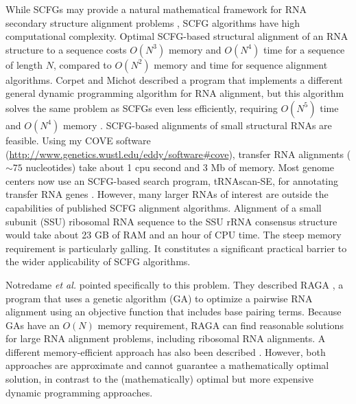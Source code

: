 \documentclass[11pt]{article}
\begin{document}
While SCFGs may provide a natural mathematical framework for RNA
secondary structure alignment problems \cite{Durbin98}, SCFG
algorithms have high computational complexity. Optimal SCFG-based
structural alignment of an RNA structure to a sequence costs $O(N^3)$
memory and $O(N^4)$ time for a sequence of length $N$, compared to
$O(N^2)$ memory and time for sequence alignment algorithms. Corpet and
Michot described a program that implements a different general dynamic
programming algorithm for RNA alignment, but this algorithm solves the
same problem as SCFGs even less efficiently, requiring $O(N^5)$ time
and $O(N^4)$ memory \cite{Corpet94}.  SCFG-based alignments of small
structural RNAs are feasible. Using my COVE software
(\url{http://www.genetics.wustl.edu/eddy/software#cove}), transfer RNA
alignments ($\sim 75$ nucleotides) take about 1 cpu second and 3 Mb of
memory. Most genome centers now use an SCFG-based search program,
tRNAscan-SE, for annotating transfer RNA genes
\cite{LoweEddy97}. However, many larger RNAs of interest are outside
the capabilities of published SCFG alignment algorithms. Alignment of
a small subunit (SSU) ribosomal RNA sequence to the SSU rRNA consensus
structure would take about 23 GB of RAM and an hour of CPU time. The
steep memory requirement is particularly galling. It constitutes a
significant practical barrier to the wider applicability of SCFG
algorithms.


Notredame \emph{et al.} pointed specifically to this problem.  They
described RAGA \cite{Notredame97}, a program that uses a genetic
algorithm (GA) to optimize a pairwise RNA alignment using an objective
function that includes base pairing terms. Because GAs have an $O(N)$
memory requirement, RAGA can find reasonable solutions for large RNA
alignment problems, including ribosomal RNA alignments. A different
memory-efficient approach has also been described
\cite{Lenhof98,LenhofVingron98}. However, both approaches are
approximate and cannot guarantee a mathematically optimal solution, in
contrast to the (mathematically) optimal but more expensive dynamic
programming approaches.
\end{document}
